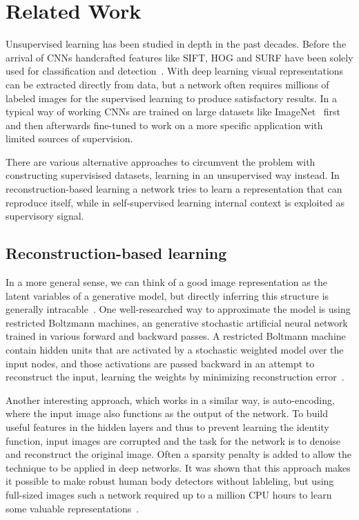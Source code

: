 %
\chapter{Related Work}
\label{ch:related_work}
Unsupervised learning has been studied in depth in the past decades. Before the arrival of CNNs handcrafted features like SIFT, HOG and SURF have been solely used for classification and detection~\cite{lee2017}. With deep learning visual representations can be extracted directly from data, but a network often requires millions of labeled images for the supervised learning to produce satisfactory results. In a typical way of working CNNs are trained on large datasets like ImageNet~\cite{deng2009} first and then afterwards fine-tuned to work on a more specific application with limited sources of supervision. 

There are various alternative approaches to circumvent the problem with constructing supervisised datasets, learning in an unsupervised way instead. In reconstruction-based learning a network tries to learn a representation that can reproduce itself, while in self-supervised learning internal context is exploited as supervisory signal.

\section{Reconstruction-based learning}
In a more general sense, we can think of a good image representation as the latent variables of a generative model, but directly inferring this structure is generally intracable~\cite{doersch2015}. One well-researched way to approximate the model is using restricted Boltzmann machines, an generative stochastic artificial neural network trained in various forward and backward passes. A restricted Boltmann machine contain hidden units that are activated by a stochastic weighted model over the input nodes, and those activations are passed backward in an attempt to reconstruct the input, learning the weights by minimizing reconstruction error~\cite{smolensky1986}. 

Another interesting approach, which works in a similar way, is auto-encoding, where the input image also functions as the output of the network. To build useful features in the hidden layers and thus to prevent learning the identity function, input images are corrupted and the task for the network is to denoise and reconstruct the original image. Often a sparsity penalty is added to allow the technique to be applied in deep networks. It was shown that this approach makes it possible to make robust human body detectors without lableling, but using full-sized images such a network required up to a million CPU hours to learn some valuable representations~\cite{le2013}.  

